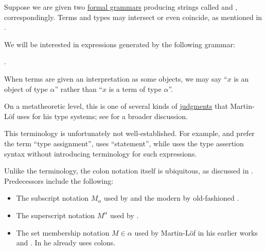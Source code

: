 \begin{definition}\label{def:type_assertion}\mimprovised
  Suppose we are given two \hyperref[def:formal_grammar/schema]{formal grammars} producing strings called  and , correspondingly. Terms and types may intersect or even coincide, as mentioned in .

  We will be interested in expressions generated by the following grammar:
  \begin{bnf*}
     { \bnfsp \bnftsq{\( : \)} \bnfsp {}}.
  \end{bnf*}
\end{definition}
\begin{comments}
  \item When terms are given an interpretation as some objects, we may say \enquote{\( x \) is an object of type \( \alpha \)} rather than \enquote{\( x \) is a term of type \( \alpha \)}.

  \item On a metatheoretic level, this is one of several kinds of \hyperref[con:judgment]{judgments} that Martin-L\"of uses for his type systems; see  for a broader discussion.

  \item This terminology is unfortunately not well-established. For example,  and  prefer the term \enquote{type assignment},  uses \enquote{statement}, while  uses the type assertion syntax without introducing terminology for such expressions.

  \item Unlike the terminology, the colon notation itself is ubiquitous, as discussed in \cite{MathSE:origin_of_colon_notation_for_type_assertions}. Predecessors include the following:
  \begin{itemize}
    \item The subscript notation \( M_\alpha \) used by \cite{Church1940STT} and the modern by old-fashioned \cite{Andrews2002STT}.
    \item The superscript notation \( M^\alpha \) used by \cite{Howard1980FormulasAsTypes}.
    \item The set membership notation \( M \in \alpha \) used by Martin-L\"of in his earlier works \cite{MartinLöf1975IntTypeTheory} and \cite{MartinLöf1984IntTypeTheory}. In \cite{MartinLöf1994TypeJudgments} he already uses colons.
  \end{itemize}
\end{comments}

